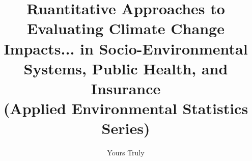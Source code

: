 \documentclass[krantz1,a4paper,11pt,ChapterTOCs,twoside,openright]{krantz}
\begin{document}
\frontmatter

\title{Ruantitative Approaches to Evaluating Climate Change Impacts... 
in Socio-Environmental Systems, Public Health, and Insurance\\
{\Large(Applied Environmental Statistics Series)}
}
\author{Yours Truly}

\maketitle


\cleardoublepage
\setcounter{page}{7} %
\tableofcontents


%
% 

\mainmatter













\printindex
\end{document}
